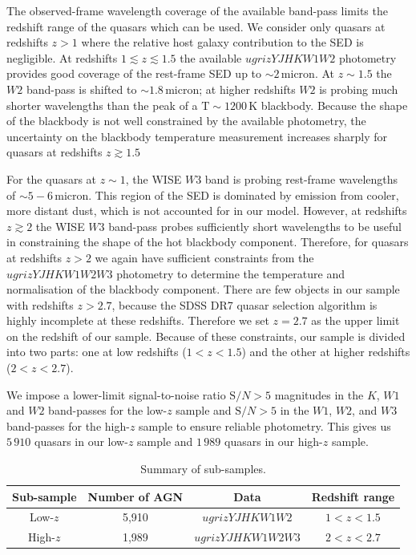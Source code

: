 The observed-frame wavelength coverage of the available band-pass limits the redshift range of the quasars which can be used. 
We consider only quasars at redshifts $z>1$ where the relative host galaxy contribution to the SED is negligible. 
At redshifts $1 \lesssim z \lesssim 1.5$ the available $ugrizYJHKW1W2$ photometry provides good coverage of the rest-frame SED up to $\sim2$\,micron.
At $z\sim1.5$ the $W2$ band-pass is shifted to $\sim1.8$\,micron; at higher redshifts $W2$ is probing much shorter wavelengths than the peak of a ${\mathrm T}\sim1200$\,K blackbody. 
Because the shape of the blackbody is not well constrained by the available photometry, the uncertainty on the blackbody temperature measurement increases sharply for quasars at redshifts $z\gtrsim1.5$ 

For the quasars at $z \sim 1$, the WISE $W3$ band is probing rest-frame wavelengths of $\sim5-6$\,micron. 
This region of the SED is dominated by emission from cooler, more distant dust, which is not accounted for in our model.
However, at redshifts $z \gtrsim 2$ the WISE $W3$ band-pass probes sufficiently short wavelengths to be useful in constraining the shape of the hot blackbody component. 
Therefore, for quasars at redshifts $z > 2$ we again have sufficient constraints from the $ugrizYJHKW1W2W3$ photometry to determine the temperature and normalisation of the blackbody component. 
There are few objects in our sample with redshifts $z > 2.7$, because the SDSS DR7 quasar selection algorithm is highly incomplete at these redshifts.  
Therefore we set $z=2.7$ as the upper limit on the redshift of our sample. 
Because of these constraints, our sample is divided into two parts: one at low redshifts ($1 < z < 1.5$) and the other at higher redshifts ($2 < z < 2.7$). 

We impose a lower-limit signal-to-noise ratio ${\mathrm S/N} > 5$ magnitudes in the $K$, $W1$ and $W2$ band-passes for the low-$z$ sample and ${\mathrm S/N} > 5$ in the $W1$, $W2$, and $W3$ band-passes for the high-$z$ sample to ensure reliable photometry.
This gives us $5\,910$ quasars in our low-$z$ sample and $1\,989$ quasars in our high-$z$ sample. 

\begin{table}
  \footnotesize
  \centering
  \begin{tabular}{cccc}
    \hline 
    Sub-sample & Number of AGN & Data & Redshift range \\
    \hline 
    Low-$z$ & 5,910 & $ugrizYJHKW1W2$ & $1 < z < 1.5$ \\
    High-$z$ & 1,989 & $ugrizYJHKW1W2W3$ & $2 < z < 2.7$ \\           
    \hline
  \end{tabular}
  \caption{Summary of sub-samples.}
  \label{tab:sub-samples}
\end{table}


